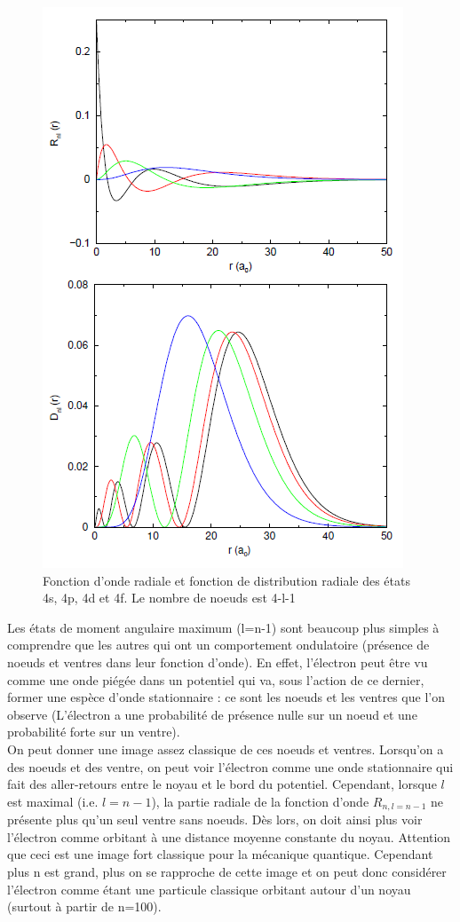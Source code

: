 \begin{figure}[tph]
    \centering
    \includegraphics{Images2/spdf.PNG}
    \caption{Fonction d'onde radiale et fonction de distribution radiale des états 4s, 4p, 4d et 4f. Le nombre de noeuds est 4-l-1}
\end{figure}

Les états de moment angulaire maximum (l=n-1) sont beaucoup plus simples à comprendre que les autres qui ont un comportement ondulatoire (présence de noeuds et ventres dans leur fonction d'onde). En effet, l'électron peut être vu comme une onde piégée dans un potentiel qui va, sous l'action de ce dernier, former une espèce d'onde stationnaire : ce sont les noeuds et les ventres que l'on observe (L'électron a une probabilité de présence nulle sur un noeud et une probabilité forte sur un ventre).\\
On peut donner une image assez classique de ces noeuds et ventres. Lorsqu'on a des noeuds et des ventre, on peut voir l'électron comme une onde stationnaire qui fait des aller-retours entre le noyau et le bord du potentiel. Cependant, lorsque $l$ est maximal (i.e. $l=n-1$), la partie radiale de la fonction d'onde $R_{n,l=n-1}$ ne présente plus qu'un seul ventre sans noeuds. Dès lors, on doit ainsi plus voir l'électron comme orbitant à une distance moyenne constante du noyau. Attention que ceci est une image fort classique pour la mécanique quantique. Cependant plus n est grand, plus on se rapproche de cette image et on peut donc considérer l'électron comme étant une particule classique orbitant autour d'un noyau (surtout à partir de n=100).


